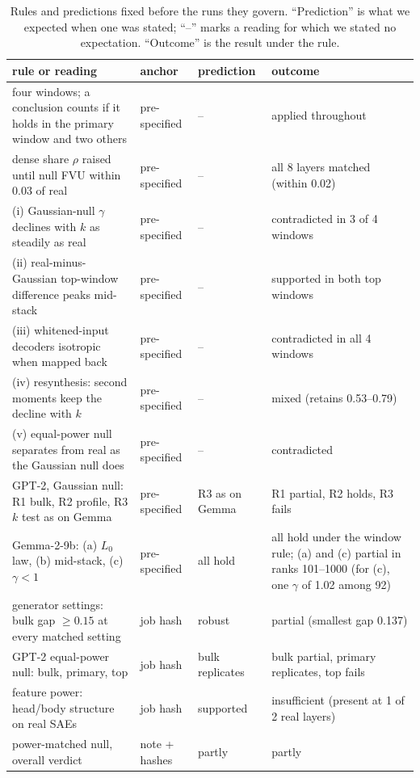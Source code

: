 \documentclass{article}
\newcommand{\Lz}{L_0}
\begin{document}
\begin{table}[!htb]
\centering
\caption{Rules and predictions fixed before the runs they govern. ``Prediction'' is what we expected when one was stated; ``--'' marks a reading for which we stated no expectation. ``Outcome'' is the result under the rule.}
\label{tab:prereg}
\footnotesize
\setlength{\tabcolsep}{3pt}
\begin{tabular}{p{4.6cm} p{2.0cm} p{2.6cm} p{6.4cm}}
\toprule
rule or reading & anchor & prediction & outcome \\
\midrule
four windows; a conclusion counts if it holds in the primary window and two others & pre-specified & -- & applied throughout \\
dense share $\rho$ raised until null FVU within 0.03 of real & pre-specified & -- & all 8 layers matched (within 0.02) \\
(i) Gaussian-null $\gamma$ declines with $k$ as steadily as real & pre-specified & -- & contradicted in 3 of 4 windows \\
(ii) real-minus-Gaussian top-window difference peaks mid-stack & pre-specified & -- & supported in both top windows \\
(iii) whitened-input decoders isotropic when mapped back & pre-specified & -- & contradicted in all 4 windows \\
(iv) resynthesis: second moments keep the decline with $k$ & pre-specified & -- & mixed (retains 0.53--0.79) \\
(v) equal-power null separates from real as the Gaussian null does & pre-specified & -- & contradicted \\
GPT-2, Gaussian null: R1 bulk, R2 profile, R3 $k$ test as on Gemma & pre-specified & R3 as on Gemma & R1 partial, R2 holds, R3 fails \\
Gemma-2-9b: (a) $\Lz$ law, (b) mid-stack, (c) $\gamma<1$ & pre-specified & all hold & all hold under the window rule; (a) and (c) partial in ranks 101--1000 (for (c), one $\gamma$ of 1.02 among 92) \\
generator settings: bulk gap $\ge 0.15$ at every matched setting & job hash & robust & partial (smallest gap 0.137) \\
GPT-2 equal-power null: bulk, primary, top & job hash & bulk replicates & bulk partial, primary replicates, top fails \\
feature power: head/body structure on real SAEs & job hash & supported & insufficient (present at 1 of 2 real layers) \\
power-matched null, overall verdict & note + hashes & partly & partly \\

\end{tabular}
\end{table}
\end{document}
